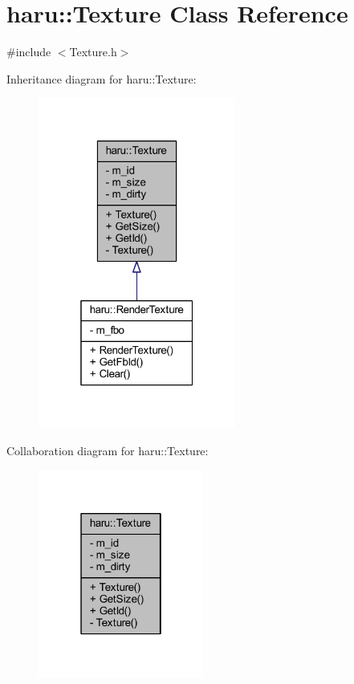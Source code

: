 \hypertarget{classharu_1_1_texture}{}\section{haru\+:\+:Texture Class Reference}
\label{classharu_1_1_texture}


{\ttfamily \#include $<$Texture.\+h$>$}



Inheritance diagram for haru\+:\+:Texture\+:\nopagebreak
\begin{figure}[H]
\begin{center}
\leavevmode
\includegraphics[width=184pt]{classharu_1_1_texture__inherit__graph}
\end{center}
\end{figure}


Collaboration diagram for haru\+:\+:Texture\+:\nopagebreak
\begin{figure}[H]
\begin{center}
\leavevmode
\includegraphics[width=154pt]{classharu_1_1_texture__coll__graph}
\end{center}
\end{figure}
